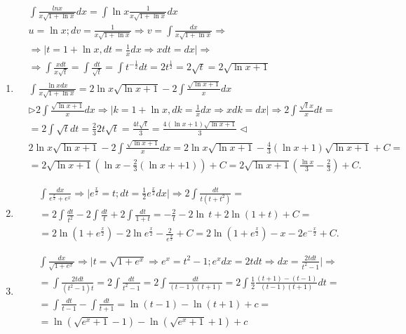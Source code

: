 \documentclass[a4paper, 12pt]{article}
\begin{document}
\begin{enumerate}
 
 \item %
 
 \begin{align*}
  &\int{\frac{lnx}{x\sqrt{1+ \ln x}}dx} = \int{\ln x \frac{1}{x \sqrt{1+\ln x}}dx} \\
  &u = \ln x; dv = \frac{1}{x \sqrt{1+\ln x}} \Rightarrow v = \int {\frac{dx}{x\sqrt{1+ \ln x}}} \Rightarrow \\
  &\Rightarrow
   \Big| t = 1 + \ln x, dt = \frac{1}{x}dx \Rightarrow xdt=dx \Big| \Rightarrow \\
  &\Rightarrow
  \int{\frac{xdt}{x\sqrt{t}}} = \int{\frac{dt}{\sqrt{t}}} = \int{t^{-\frac{1}{2}}dt} = 2t^{\frac{1}{2}}=2\sqrt{t} = 2\sqrt{\ln x + 1} \\
  &\int \frac{\ln x dx}{x \sqrt{1+\ln x}} =  2 \ln x \sqrt{\ln x+1} - 2 \int{\frac{\sqrt{\ln x+1}}{x}dx} \\
  &\rhd 2\int{\frac{\sqrt{\ln x+1}}{x}dx} \Rightarrow 
  \Big| k = 1 + \ln x, dk = \frac{1}{x}dx \Rightarrow xdk=dx \Big| \Rightarrow
  2\int{\frac{\sqrt{t}x}{x}dt} = \\
  &= 2\int{\sqrt{t}dt} = \frac{2}{3}2t\sqrt{t} = \frac{4t\sqrt{t}}{3}=\frac{4(\ln x + 1)\sqrt{\ln x +1}}{3} \lhd \\
  &2 \ln x \sqrt{\ln x+1} - 2 \int{\frac{\sqrt{\ln x+1}}{x}dx} = 2 \ln x \sqrt{\ln x+1} - \frac{4}{3}(\ln x + 1) \sqrt{\ln x + 1} + C = \\
  &= 2 \sqrt{\ln x + 1} (\ln x - \frac{2}{3} (\ln x + +1)) + C = 2\sqrt{\ln x + 1}(\frac{\ln x}{3}-\frac{2}{3})+C  
 .\end{align*}
 
 \item %
 \begin{align*}
    &\int \frac{dx}{e^{\frac{x}{2}} + e^x} \Rightarrow
    \Big|e^{\frac{x}{2}} = t ; dt = \frac{1}{2} e^{\frac{x}{2}}dx \Big| \Rightarrow 
    2\int \frac{dt}{t\left(t+t^2\right)} = \\
    &= 2\int \frac{dt}{t^2} - 2\int \frac{dt}{t} + 2\int \frac{dt}{1+t} =
    -\frac{2}{t} - 2\ln\,t + 2\ln\left(1+t\right)+C= \\ 
    &= 2\ln\left(1+e^{\frac{x}{2}}\right)-2\ln e^{\frac{x}{2}} - \frac{2}{e^{\frac{x}{2}}}+C = 2\ln\left(1+e^{\frac{x}{2}}\right)-x-2e^{-\frac{x}{2}} + C    
 .\end{align*}
 
 \item %
 \begin{align*}
    &\int{\frac{dx}{\sqrt{1+e^x}}} 
    \Rightarrow \Big| t = \sqrt{1+e^x} \Rightarrow e^x = t^2-1; e^xdx = 2tdt \Rightarrow dx = \frac{2tdt}{t^2-1} \Big| \Rightarrow \\
    &= \int{\frac{2tdt}{(t^2-1)t}} = 2\int{\frac{dt}{t^2-1}} = 
    2\int{\frac{dt}{(t-1)(t+1)}} = 
    2\int{\frac{1}{2}\frac{(t+1)-(t-1)}{(t-1)(t+1)}dt} = \\
    &= \int{\frac{dt}{t-1}} - \int{\frac{dt}{t+1}} =
    \ln{(t-1)} - \ln{(t+1)} + c = \\
    &=\ln{(\sqrt{e^x+1}-1)} - \ln{(\sqrt{e^x+1}+1)}+c
    \end{align*}
 

\end{enumerate}
\end{document}
